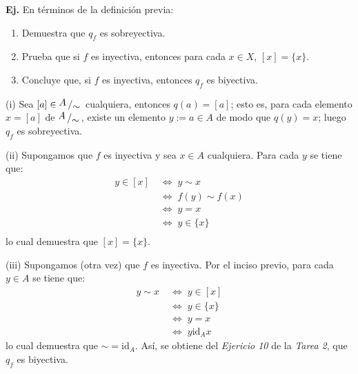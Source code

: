 \documentclass[letterpaper,DIV=14,headsepline,12pt]{scrartcl}
\makeatletter
\newcounter{Ejer}
\newcommand{\pts}{}
\newenvironment{ejercicio}[1]{\noindent
    \ifthenelse{\equal{#1}{1} \OR \equal{#1}{+1}}{\renewcommand{\pts}{\textbf{(#1 pt)}}}{\renewcommand{\pts}{\textbf{(#1 pts)}}}\textbf{Ej. \theEjer} \pts\stepcounter{Ejer}}{\vspace{.3cm}}
\newcommand{\id}{\mathrm{id}}
\newcommand{\quot}[2]{{\raisebox{.2em}{$#1$}\left/\raisebox{-.2em}{$#2$}\right.}}
\renewenvironment{proof}[1][]{%
        \par\pushQED{\qed}%
        \normalfont\topsep6pt \partopsep0pt %
        \trivlist
        \item[\hskip\labelsep
                \textbf{\textit{Demostración.}}%
        ]#1
        }{%
        \popQED\endtrivlist\@endpefalse
    }
\makeatother
\begin{document}
    \begin{ejercicio}{1.5}
        En términos de la definición previa:
        \begin{enumerate}
            \item Demuestra que $q_f$ es sobreyectiva.
            \item Prueba que si $f$ es inyectiva, entonces para cada $x \in X$,
            $[x]=\{x\}$.
            \item Concluye que, si $f$ es inyectiva, entonces $q_f$ es
            biyectiva.
        \end{enumerate}
    \end{ejercicio}
    \begin{proof}
        (i) Sea $[a] \in \quot{A}{\sim}$ cualquiera, entonces $q(a)=[a]$; esto es, para cada elemento $x=[a]$ de $\quot{A}{\sim}$, existe un elemento $y:=a \in A$ de modo que $q(y)=x$; luego $q_f$ es sobreyectiva.

        (ii) Supongamos que $f$ es inyectiva y sea $x \in A$ cualquiera. Para cada $y$ se tiene que:
        \begin{align*}
            y \in [x] &\; \Leftrightarrow \; y \sim x \tag*{(Definición de clase de equivalencia)} \\
            &\; \Leftrightarrow \; f(y) \sim f(x) \tag*{(Definición de $\sim$)} \\
            &\; \Leftrightarrow \; y=x \tag*{($f$ es función y es inyectiva)} \\
            &\; \Leftrightarrow \; y \in \{x\} \tag*{(Conjunto unitario)} \\
        \end{align*}
        lo cual demuestra que $[x]=\{x\}$.

        (iii) Supongamos (otra vez) que $f$ es inyectiva. Por el inciso previo, para cada $y \in A$ se tiene que:
        \begin{align*}
            y \sim x &\; \Leftrightarrow \; y \in [x] \tag*{(Definición de clase de equivalencia)} \\
            &\; \Leftrightarrow \; y \in \{x\} \tag*{(Inciso previo)} \\
            &\; \Leftrightarrow \; y=x \tag*{(Conjunto unitario)} \\
            &\; \Leftrightarrow \; y \mathrel{\id_A} x \tag*{(Conjunto unitario)}
        \end{align*}
        lo cual demuestra que $\sim = \id_A$. Así, se obtiene del \textit{Ejericio 10} de la \textit{Tarea 2}, que $q_f$ es biyectiva.
    \end{proof}
\end{document}
